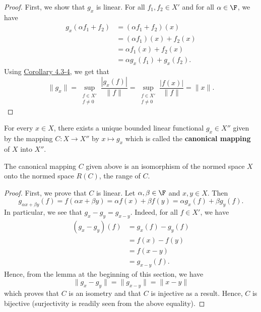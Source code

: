 \begin{proof}
    First, we show that \( {g}_{x} \) is linear. For all \( {f}_{1}, {f}_{2} \in X' \) and for all \( \alpha \in \F  \), we have 
    \begin{align*}
        {g}_{x}(\alpha {f}_{1} + {f}_{2}) &= (\alpha {f}_{1} + {f}_{2})(x) \\
                                          &= (\alpha {f}_{1})(x) + {f}_{2}(x) \\
                                          &= \alpha {f}_{1}(x) + {f}_{2}(x) \\
                                          &= \alpha {g}_{x}({f}_{1}) + {g}_{x}({f}_{2}).
    \end{align*}
    Using {\hyperref[4.3-4]{Corollary 4.3-4}}, we get that 
    \[  \|{g}_{x}\| = \sup_{\substack{f \in X' \\ f \neq 0 }} \frac{ | {g}_{x}(f) |  }{ \|f\| }  = \sup_{\substack{f \in X' \\ f \neq 0 }} \frac{ | f(x) |  }{ \|f\| }  = \|x\|.  \]
\end{proof}

\begin{definition}
    For every \( x \in X  \), there exists a unique bounded linear functional \( {g}_{x} \in X'' \) given by the mapping \( C: X \to X'' \) by \( x \mapsto {g}_{x} \) which is called the \textbf{canonical mapping} of \( X  \) into \( X'' \).  
\end{definition}

\begin{lemma}
  The canonical mapping \( C  \) given above is an isomorphism of the normed space \( X  \) onto the normed space \( R(C) \), the range of \( C  \).   
\end{lemma}

\begin{proof}
    First, we prove that \( C  \) is linear. Let \( \alpha, \beta \in \F  \) and \( x,y \in X  \). Then
    \[  {g}_{\alpha x + \beta y} (f) = f(\alpha x + \beta y) = \alpha f(x) + \beta f(y) = \alpha {g}_{x}(f) + \beta {g}_{y}(f). \]
    In particular, we see that \( {g}_{x} - {g}_{y} = {g}_{x-y} \). Indeed, for all \( f \in X' \), we have 
    \begin{align*}
        ({g}_{x} - {g}_{y})(f) &= {g}_{x}(f) - {g}_{y}(f)  \\
                               &= f(x) - f(y) \\
                               &= f(x-y) \tag{\( f \) is linear} \\
                               &= {g}_{x-y}(f).
    \end{align*}
    Hence, from the lemma at the beginning of this section, we have 
    \[ \|{g}_{x} - {g}_{y}\|= \|{g}_{x-y}\| = \|x-y\| \]
    which proves that \( C \) is an isometry and that \( C  \) is injective as a result. Hence, \( C  \) is bijective (surjectivity is readily seen from the above equality). 
\end{proof}

